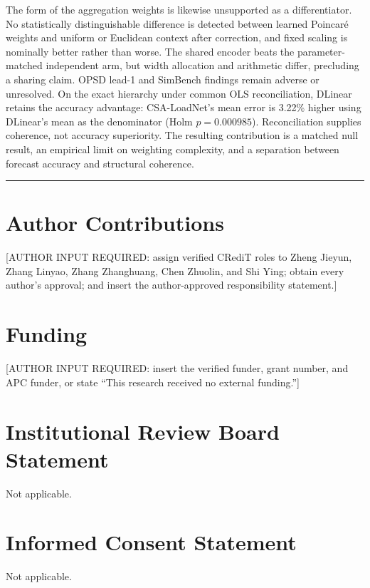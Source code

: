 \documentclass[electronics,article,submit,moreauthors]{Definitions/mdpi}
\begin{document}
The form of the aggregation weights is likewise unsupported as a differentiator. No statistically distinguishable difference is detected between learned Poincar\'{e} weights and uniform or Euclidean context after correction, and fixed scaling is nominally better rather than worse. The shared encoder beats the parameter-matched independent arm, but width allocation and arithmetic differ, precluding a sharing claim. OPSD lead-1 and SimBench findings remain adverse or unresolved. On the exact hierarchy under common OLS reconciliation, DLinear retains the accuracy advantage: CSA-LoadNet's mean error is 3.22\% higher using DLinear's mean as the denominator (Holm \(p=0.000985\)). Reconciliation supplies coherence, not accuracy superiority. The resulting contribution is a matched null result, an empirical limit on weighting complexity, and a separation between forecast accuracy and structural coherence.

\begin{center}\rule{0.5\linewidth}{0.5pt}\end{center}

\section*{Author Contributions}

{[}AUTHOR INPUT REQUIRED: assign verified CRediT roles to Zheng Jieyun, Zhang Linyao, Zhang Zhanghuang, Chen Zhuolin, and Shi Ying; obtain every author's approval; and insert the author-approved responsibility statement.{]}

\section*{Funding}

{[}AUTHOR INPUT REQUIRED: insert the verified funder, grant number, and APC funder, or state ``This research received no external funding.''{]}

\section*{Institutional Review Board Statement}

Not applicable.

\section*{Informed Consent Statement}

Not applicable.
\end{document}
